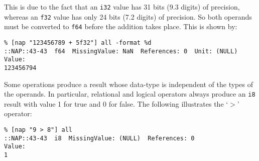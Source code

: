 This is due to the fact that an 
  \texttt{i32} value has 31 bits (9.3 digits) of precision, whereas
  an 
  \texttt{f32} value has only 24 bits (7.2 digits) of precision. So
  both operands must be converted to 
  \texttt{f64} before the addition takes place. This is shown by:
  \begin{verbatim}
% [nap "123456789 + 5f32"] all -format %d
::NAP::43-43  f64  MissingValue: NaN  References: 0  Unit: (NULL)
Value:
123456794
\end{verbatim}

  

Some operations produce a result whose data-type is independent of
  the types of the operands. In particular, relational and logical
  operators always produce an 
  \texttt{i8} result with value 1 for true and 0 for false. The
  following illustrates the `\texttt{$>$}' operator:
  \begin{verbatim}
% [nap "9 > 8"] all
::NAP::43-43  i8  MissingValue: (NULL)  References: 0
Value:
1
\end{verbatim}


